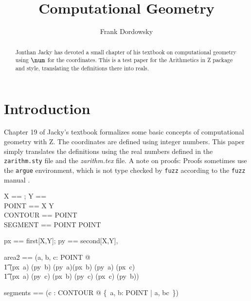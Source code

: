 \documentclass[12pt]{scrartcl}
\begin{document}
\title{Computational Geometry}
\author{Frank Dordowsky}

\maketitle

\begin{abstract}
  Jonthan Jacky has devoted a small chapter of his textbook
  \cite{Jacky1997a} on computational geometry using $\num$ for the
  coordinates. This is a test paper for the Arithmetics in Z package
  and style, translating the definitions there into reals.
\end{abstract}


\section{Introduction}
\label{sec:intro}
Chapter 19 of Jacky's textbook \cite{Jacky1997a} formalizes some basic
concepts of computational geometry with Z. The  coordinates are
defined using integer numbers. This paper simply translates the
definitions using the real numbers defined in the \texttt{zarithm.sty}
file and the \emph{zarithm.tex} file.
%
A note on proofs: Proofs sometimes use the \texttt{argue} environment,
which is not type checked by \texttt{fuzz} according to the
\texttt{fuzz} manual \cite{Spivey2000}.
%
\begin{zed}
  X == \real; Y == \real \\
  POINT == X \cross Y \\
  CONTOUR == \seq POINT \\
  SEGMENT == POINT \cross POINT \\
\end{zed}
%
\begin{zed}
  px == first[X,Y]; py == second[X,Y], 
\end{zed}
%
\begin{zed}
  area2 == (\lambda a, b, c: POINT @ \\
  \t1 (px~a) \amult (py~b) \aminus (py~a)\amult (px~b) \aplus (py~a)\amult
  (px~c) \\
  \t1 \aminus (px~a) \amult (py~c) \aplus (px~b) \amult (py~c) \aminus
  (px~c) \amult (py~b))
\end{zed}
%
\begin{zed}
  segments == (\lambda c : CONTOUR @ \{~a, b: POINT | \langle a,
  b\rangle \inseq c~\})
\end{zed}
\end{document}
